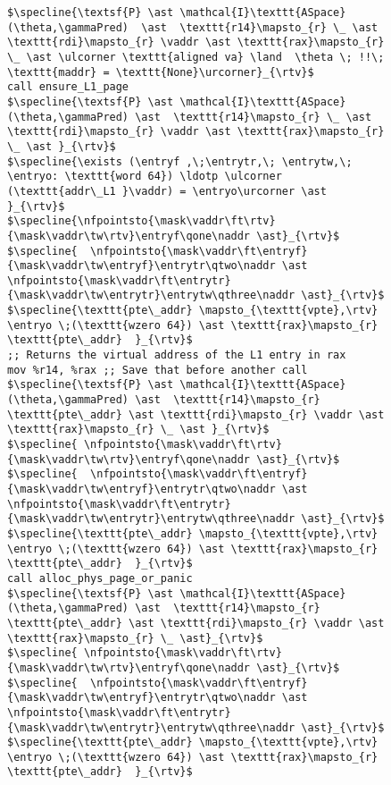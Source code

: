 \begin{figure}
  \begin{lstlisting}
$\specline{\textsf{P} \ast \mathcal{I}\texttt{ASpace}(\theta,\gammaPred)  \ast  \texttt{r14}\mapsto_{r} \_ \ast \texttt{rdi}\mapsto_{r} \vaddr \ast \texttt{rax}\mapsto_{r} \_ \ast \ulcorner \texttt{aligned va} \land  \theta \; !!\; \texttt{maddr} = \texttt{None}\urcorner}_{\rtv}$
call ensure_L1_page
$\specline{\textsf{P} \ast \mathcal{I}\texttt{ASpace}(\theta,\gammaPred) \ast  \texttt{r14}\mapsto_{r} \_ \ast \texttt{rdi}\mapsto_{r} \vaddr \ast \texttt{rax}\mapsto_{r} \_ \ast }_{\rtv}$
$\specline{\exists (\entryf ,\;\entrytr,\; \entrytw,\; \entryo: \texttt{word 64}) \ldotp \ulcorner (\texttt{addr\_L1 }\vaddr) = \entryo\urcorner \ast }_{\rtv}$
$\specline{\nfpointsto{\mask\vaddr\ft\rtv}{\mask\vaddr\tw\rtv}\entryf\qone\naddr \ast}_{\rtv}$ 
$\specline{  \nfpointsto{\mask\vaddr\ft\entryf}{\mask\vaddr\tw\entryf}\entrytr\qtwo\naddr \ast \nfpointsto{\mask\vaddr\ft\entrytr}{\mask\vaddr\tw\entrytr}\entrytw\qthree\naddr \ast}_{\rtv}$
$\specline{\texttt{pte\_addr} \mapsto_{\texttt{vpte},\rtv} \entryo \;(\texttt{wzero 64}) \ast \texttt{rax}\mapsto_{r} \texttt{pte\_addr}  }_{\rtv}$
;; Returns the virtual address of the L1 entry in rax
mov %r14, %rax ;; Save that before another call
$\specline{\textsf{P} \ast \mathcal{I}\texttt{ASpace}(\theta,\gammaPred) \ast  \texttt{r14}\mapsto_{r} \texttt{pte\_addr} \ast \texttt{rdi}\mapsto_{r} \vaddr \ast \texttt{rax}\mapsto_{r} \_ \ast }_{\rtv}$
$\specline{ \nfpointsto{\mask\vaddr\ft\rtv}{\mask\vaddr\tw\rtv}\entryf\qone\naddr \ast}_{\rtv}$ 
$\specline{  \nfpointsto{\mask\vaddr\ft\entryf}{\mask\vaddr\tw\entryf}\entrytr\qtwo\naddr \ast \nfpointsto{\mask\vaddr\ft\entrytr}{\mask\vaddr\tw\entrytr}\entrytw\qthree\naddr \ast}_{\rtv}$
$\specline{\texttt{pte\_addr} \mapsto_{\texttt{vpte},\rtv} \entryo \;(\texttt{wzero 64}) \ast \texttt{rax}\mapsto_{r} \texttt{pte\_addr}  }_{\rtv}$
call alloc_phys_page_or_panic
$\specline{\textsf{P} \ast \mathcal{I}\texttt{ASpace}(\theta,\gammaPred) \ast  \texttt{r14}\mapsto_{r} \texttt{pte\_addr} \ast \texttt{rdi}\mapsto_{r} \vaddr \ast \texttt{rax}\mapsto_{r} \_ \ast}_{\rtv}$
$\specline{ \nfpointsto{\mask\vaddr\ft\rtv}{\mask\vaddr\tw\rtv}\entryf\qone\naddr \ast}_{\rtv}$ 
$\specline{  \nfpointsto{\mask\vaddr\ft\entryf}{\mask\vaddr\tw\entryf}\entrytr\qtwo\naddr \ast \nfpointsto{\mask\vaddr\ft\entrytr}{\mask\vaddr\tw\entrytr}\entrytw\qthree\naddr \ast}_{\rtv}$
$\specline{\texttt{pte\_addr} \mapsto_{\texttt{vpte},\rtv} \entryo \;(\texttt{wzero 64}) \ast \texttt{rax}\mapsto_{r} \texttt{pte\_addr}  }_{\rtv}$

\end{lstlisting}
\end{figure}
